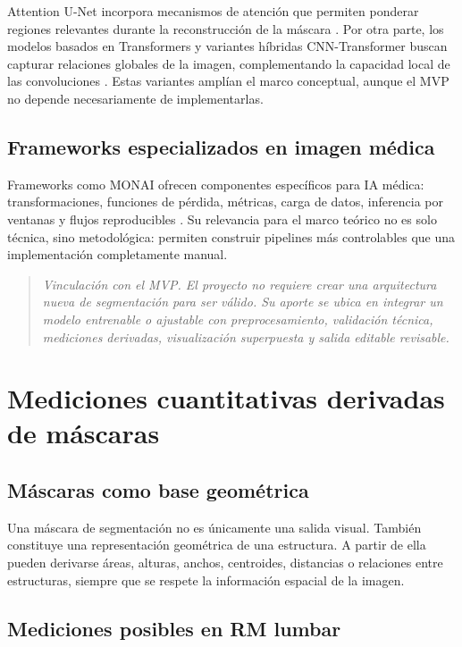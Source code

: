 Attention U-Net incorpora mecanismos de atención que permiten ponderar regiones relevantes durante la reconstrucción de la máscara \parencite{oktay_attention_unet_2018}. Por otra parte, los modelos basados en Transformers y variantes híbridas CNN-Transformer buscan capturar relaciones globales de la imagen, complementando la capacidad local de las convoluciones \parencite{dosovitskiy_vit_2021}. Estas variantes amplían el marco conceptual, aunque el MVP no depende necesariamente de implementarlas.

\subsection{Frameworks especializados en imagen médica}

Frameworks como MONAI ofrecen componentes específicos para IA médica: transformaciones, funciones de pérdida, métricas, carga de datos, inferencia por ventanas y flujos reproducibles \parencite{monai_software}. Su relevancia para el marco teórico no es solo técnica, sino metodológica: permiten construir pipelines más controlables que una implementación completamente manual.

\begin{quote}
\itshape
Vinculación con el MVP. El proyecto no requiere crear una arquitectura nueva de segmentación para ser válido. Su aporte se ubica en integrar un modelo entrenable o ajustable con preprocesamiento, validación técnica, mediciones derivadas, visualización superpuesta y salida editable revisable.
\end{quote}

\section{Mediciones cuantitativas derivadas de máscaras}

\subsection{Máscaras como base geométrica}

Una máscara de segmentación no es únicamente una salida visual. También constituye una representación geométrica de una estructura. A partir de ella pueden derivarse áreas, alturas, anchos, centroides, distancias o relaciones entre estructuras, siempre que se respete la información espacial de la imagen.

\subsection{Mediciones posibles en RM lumbar}

